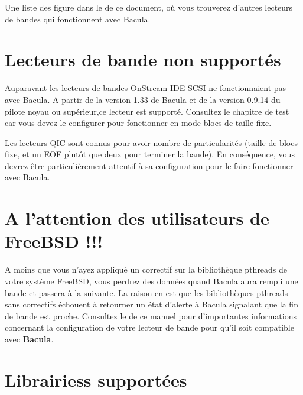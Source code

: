 Une liste des 
 figure dans le 
 de
ce document, o\`u vous trouverez d'autres lecteurs de bandes qui fonctionnent avec
Bacula. 

\section{Lecteurs de bande non support\'es}
\label{UnSupportedDrives}

Auparavant les lecteurs de bandes OnStream IDE-SCSI ne fonctionnaient pas avec
Bacula. A partir de la version 1.33 de Bacula et de la version 0.9.14 du
pilote noyau ou sup\'erieur,ce lecteur est support\'e. Consultez le chapitre
de test car vous devez le configurer pour fonctionner en mode blocs de taille
fixe. 

Les lecteurs QIC sont connus pour avoir nombre de particularit\'es (taille de
blocs fixe, et un EOF plut\^ot que deux pour terminer la bande). En
cons\'equence, vous devrez \^etre particuli\`erement attentif \`a sa
configuration pour le faire fonctionner avec Bacula. 

\section{A l'attention des utilisateurs de FreeBSD !!!}

A moins que vous n'ayez appliqu\'e un correctif sur la biblioth\`eque pthreads
de votre syst\`eme FreeBSD, vous perdrez des donn\'ees quand Bacula aura
rempli une bande et passera \`a la suivante. La raison en est que les
biblioth\`eques pthreads sans correctifs \'echouent \`a retourner un \'etat
d'alerte \`a Bacula signalant que la fin de bande est proche. Consultez le 
 de
ce manuel pour d'importantes informations concernant la configuration de votre
lecteur de bande pour qu'il soit compatible avec {\bf Bacula}. 

\section{Librairiess support\'ees}

